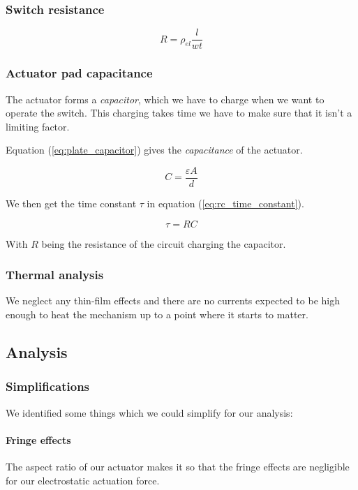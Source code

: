 \subsubsection{Switch resistance}
\begin{equation}
	R = \rho_{el}\frac{l}{wt}
	\label{eq:resistance}
\end{equation}

\subsubsection{Actuator pad capacitance}
The actuator forms a \emph{capacitor}, which we have to charge when we want to operate the switch.
This charging takes time we have to make sure that it isn't a limiting factor.

Equation (\ref{eq:plate_capacitor}) gives the \emph{capacitance} of the actuator.

\begin{equation}
	C = \frac{\varepsilon A}{d}
	\label{eq:plate_capacitor}
\end{equation}

We then get the time constant $\tau$ in equation (\ref{eq:rc_time_constant}).

\begin{equation}
    \tau = RC
    \label{eq:rc_time_constant}
\end{equation}

With $R$ being the resistance of the circuit charging the capacitor.

\subsubsection{Thermal analysis}

We neglect any thin-film effects and there are no currents expected to be high enough to heat the mechanism up to a point where it starts to matter.


\subsection{Analysis}
\label{sec:analysis}

\subsubsection{Simplifications}
\label{ssub:simplifications}
We identified some things which we could simplify for our analysis:

\paragraph{Fringe effects}
The aspect ratio of our actuator makes it so that the fringe effects are negligible for our electrostatic actuation force.

